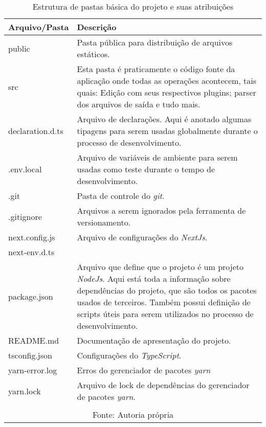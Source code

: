\begin{table}[H]
    \centering
    \caption{Estrutura de pastas básica do projeto e suas atribuições}
    \label{tbl:pastas-projeto}
    \renewcommand{\arraystretch}{1.5}
    \begin{tabular}{p{3.2000cm} p{12.8000cm}}
        \hline
        \textbf{Arquivo/Pasta} & \textbf{Descrição} \\
        \hline
        public & Pasta pública para distribuição de arquivos estáticos. \\
		src & Esta pasta é praticamente
            o código fonte da aplicação onde todas as operações acontecem, tais
            quais: Edição com seus respectivos plugins; parser dos arquivos de
            saída e tudo mais.
         \\
		declaration.d.ts & Arquivo de declarações. Aqui é anotado algumas tipagens para serem usadas
            globalmente durante o processo de desenvolvimento.
         \\
		.env.local & Arquivo de variáveis de ambiente para serem usadas como teste durante                o tempo de desenvolvimento. \\
		.git & Pasta de controle do \textit{git}. \\
		.gitignore & Arquivos a serem ignorados pela ferramenta de versionamento. \\
		next.config.js & Arquivo de configurações do \textit{NextJs}. \\
		next-env.d.ts &  \\
		package.json & Arquivo que define que o projeto é um projeto \textit{NodeJs}. Aqui está toda a informação sobre dependências
            do projeto, que são todos os pacotes usados de terceiros. Também possui definição
            de scripts úteis para serem utilizados no processo de desenvolvimento.
         \\
		README.md & Documentação de apresentação do projeto. \\
		tsconfig.json & Configurações do \textit{TypeScript}. \\
		yarn-error.log & Erros do gerenciador de pacotes \textit{yarn} \\
		yarn.lock & Arquivo de lock de dependências do gerenciador de pacotes \textit{yarn}. \\
        \hline
        \\\multicolumn{2}{c}{\fontsize{10pt}{12pt}Fonte: Autoria própria}
    \end{tabular}
\end{table}

